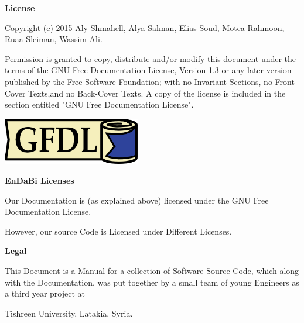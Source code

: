 \documentclass{slides}
\begin{document}
\newpage
\begin{center} 
\textbf{\Large License}
\end{center}
\begin{center}
 Copyright (c)  2015  Aly Shmahell, Alya Salman, Elias Soud, Motea Rahmoon, Ruaa Sleiman, Wassim Ali. 
 \end{center}
\begin{center} 
Permission is granted to copy, distribute and/or modify this document
under the terms of the GNU Free Documentation License, Version 1.3
or any later version published by the Free Software Foundation; with no Invariant Sections, no Front-Cover Texts,and no Back-Cover Texts.
A copy of the license is included in the section entitled "GNU Free Documentation License".
\newline
\end{center}
\begin{center}
\includegraphics[totalheight=20mm,width=60mm]{gfdl-logo-med.png}
\end{center}
\newpage

\newpage
\begin{center}
\textbf{\Large EnDaBi Licenses}
\end{center}
\begin{center}
Our Documentation is (as explained above) licensed under the GNU Free Documentation License.
\end{center}
\begin{center}
However, our source Code is Licensed under Different Licenses.
\end{center}
\newpage
 \begin{center} \textbf{\Large Legal} \end{center}
  \begin{center}
  \begin{normalsize}
  This Document is a Manual for a collection of Software Source Code, which along with the Documentation, was put together by a small team of young Engineers as a third year project at  
  \end{normalsize}
  \end{center} 
  \begin{center}
  Tishreen University, Latakia, Syria.
  
  \end{center} 
 
\end{document}
